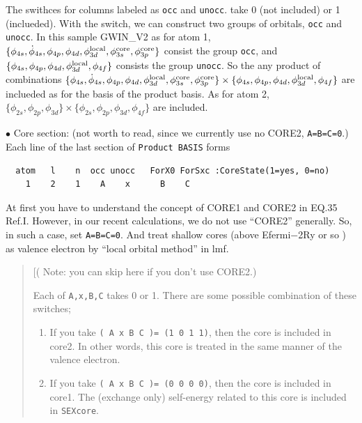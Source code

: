 \documentclass[a4paper,10pt,epsf,fleqn]{article}
\newcommand{\raw}[1]{{\tt #1}}
\begin{document}
{The swithces for columns labeled as \verb#occ# and \verb#unocc#. take 0 (not included) 
or 1 (inclueded). With the switch, we can construct two groups of orbitals,
\verb#occ# and \verb#unocc#.
In this sample {\sf GWIN\_V2} as for atom 1,
$\{ \phi_{4s},\dot{\phi}_{4s},\phi_{4p},\phi_{4d},\phi^{\rm local}_{3d}, 
\phi^{\rm core}_{3s},\phi^{\rm core}_{3p} \}$
consist the group \verb#occ#, and
$\{ \phi_{4s},\phi_{4p},\phi_{4d},\phi^{\rm local}_{3d},\phi_{4f} \}$
consists the group  \verb#unocc#.
So the any product of combinations
$\{ \phi_{4s},\dot{\phi}_{4s},\phi_{4p},\phi_{4d},\phi^{\rm local}_{3d}, 
\phi^{\rm core}_{3s},\phi^{\rm core}_{3p} \}
\times \{ \phi_{4s},\phi_{4p},\phi_{4d},\phi^{\rm local}_{3d},\phi_{4f} \}$
are inclueded as for the basis of the product basis.
As for atom 2,
$\{ \phi_{2s},\phi_{2p},\phi_{3d} \} 
\times \{ \phi_{2s},\phi_{2p},\phi_{3d},\phi_{4f} \}$
are included.


\vspace{5mm}
\noindent $\bullet$ Core section: (not worth to read, since we currently use no CORE2, \verb#A=B=C=0#.)\\

\noindent Each line of the last section of {\tt Product BASIS} forms
{\baselineskip=2.6mm
\begin{verbatim}
  atom   l    n  occ unocc   ForX0 ForSxc :CoreState(1=yes, 0=no)
    1    2    1    A    x      B    C
\end{verbatim}}
At first you have to understand the concept of CORE1 and CORE2 in EQ.35 Ref.I.
However, in our recent calculations, we do not use ``CORE2'' generally.
So, in such a case, set \verb#A=B=C=0#. And treat shallow cores (above Efermi$-$2Ry or so )
as valence electron by ``local orbital method'' in lmf.

\begin{quote}
[( Note: you can skip here if you don't use CORE2.)

Each of \raw{A,x,B,C} takes 0 or 1.
There are some possible combination of these switches;
\begin{enumerate}
\item 
If you take 
{\tt ( A  x   B    C )= (1 0 1 1)},
then the core is included in core2. In other words, this core is treated in the same 
manner of the valence electron.

\item 
If you take
{\tt ( A  x   B    C )= (0 0 0 0)},
then the core is included in core1.
The (exchange only) self-energy related to this core is included in {\tt SEXcore}.


\end{enumerate}
\end{quote}}
\end{document}
